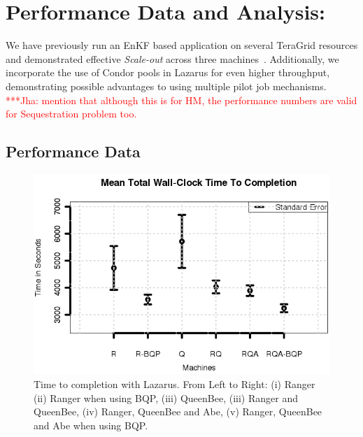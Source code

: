 \documentclass{rspublic}
\newcommand{\jhanote}[1]{ {\textcolor{red} { ***Jha: #1 }}}
\newcommand{\jhanote}[1]{}
\begin{document}
\section{Performance Data and Analysis:} 

We have previously run an EnKF based application on several TeraGrid
resources and demonstrated effective {\it Scale-out} across three
machines~\citep{gmac}.  Additionally, we incorporate the use of Condor
pools in Lazarus for even higher throughput, demonstrating possible
advantages to using multiple pilot job mechanisms. \jhanote{mention
  that although this is for HM, the performance numbers are valid for
  Sequestration problem too.}

\subsection{Performance Data} 

\begin{figure}
\begin{center}
  \includegraphics*[scale=0.5,angle=0]{figures/Figure7.png}
\end{center}
\caption{Time to completion with Lazarus. From Left to Right: (i)
  Ranger (ii) Ranger when using BQP, (iii) QueenBee, (iii) Ranger and
  QueenBee, (iv) Ranger, QueenBee and Abe, (v) Ranger, QueenBee and
  Abe when using BQP.}
\label{fig:SingleVsDistributed}
\end{figure}
\end{document}
